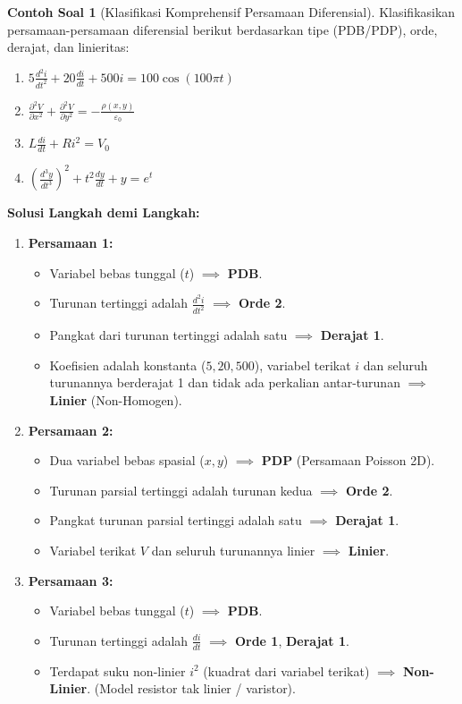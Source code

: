 \documentclass[11pt,a4paper]{article}
\theoremstyle{definition}
\newtheorem{example}{Contoh Soal}[section]
\begin{document}
\begin{example}[Klasifikasi Komprehensif Persamaan Diferensial]
Klasifikasikan persamaan-persamaan diferensial berikut berdasarkan tipe (PDB/PDP), orde, derajat, dan linieritas:
\begin{enumerate}
    \item $5 \frac{d^2 i}{dt^2} + 20 \frac{di}{dt} + 500 i = 100 \cos(100\pi t)$
    \item $\frac{\partial^2 V}{\partial x^2} + \frac{\partial^2 V}{\partial y^2} = -\frac{\rho(x,y)}{\varepsilon_0}$
    \item $L \frac{di}{dt} + R i^2 = V_0$
    \item $\left( \frac{d^3 y}{dt^3} \right)^2 + t^2 \frac{dy}{dt} + y = e^t$
\end{enumerate}

\textbf{Solusi Langkah demi Langkah:}
\begin{enumerate}[leftmargin=*]
    \item \textbf{Persamaan 1:}
    \begin{itemize}
        \item Variabel bebas tunggal ($t$) $\implies$ \textbf{PDB}.
        \item Turunan tertinggi adalah $\frac{d^2 i}{dt^2}$ $\implies$ \textbf{Orde 2}.
        \item Pangkat dari turunan tertinggi adalah satu $\implies$ \textbf{Derajat 1}.
        \item Koefisien adalah konstanta ($5, 20, 500$), variabel terikat $i$ dan seluruh turunannya berderajat 1 dan tidak ada perkalian antar-turunan $\implies$ \textbf{Linier} (Non-Homogen).
    \end{itemize}
    
    \item \textbf{Persamaan 2:}
    \begin{itemize}
        \item Dua variabel bebas spasial ($x, y$) $\implies$ \textbf{PDP} (Persamaan Poisson 2D).
        \item Turunan parsial tertinggi adalah turunan kedua $\implies$ \textbf{Orde 2}.
        \item Pangkat turunan parsial tertinggi adalah satu $\implies$ \textbf{Derajat 1}.
        \item Variabel terikat $V$ dan seluruh turunannya linier $\implies$ \textbf{Linier}.
    \end{itemize}
    
    \item \textbf{Persamaan 3:}
    \begin{itemize}
        \item Variabel bebas tunggal ($t$) $\implies$ \textbf{PDB}.
        \item Turunan tertinggi adalah $\frac{di}{dt}$ $\implies$ \textbf{Orde 1}, \textbf{Derajat 1}.
        \item Terdapat suku non-linier $i^2$ (kuadrat dari variabel terikat) $\implies$ \textbf{Non-Linier}. (Model resistor tak linier / varistor).
    \end{itemize}
    

\end{enumerate}
\end{example}
\end{document}
